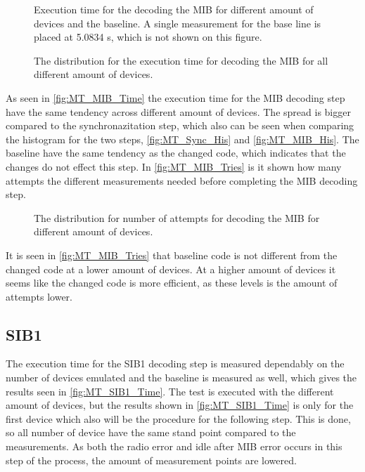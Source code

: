 \captionsetup{belowskip=0em}
\begin{minipage}{0.48\textwidth}
\begin{figure}[H]
\centering
\resizebox{0.9\textwidth}{!}{
}
\caption{Execution time for the decoding the MIB for different amount of devices and the baseline. A single measurement for the base line is placed at 5.0834 s, which is not shown on this figure.}
\label{fig:MT_MIB_Time}
\end{figure}
\end{minipage}%
\hfill
\begin{minipage}{0.48\textwidth}
\begin{figure}[H]
\centering
\resizebox{0.9\textwidth}{!}{
}
\caption{The distribution for the execution time for decoding the MIB for all different amount of devices.}
\label{fig:MT_MIB_His}
\end{figure}
\end{minipage}
\captionsetup{belowskip=-1.5em}

As seen in \autoref{fig:MT_MIB_Time} the execution time for the MIB decoding step have the same tendency across different amount of devices. The spread is bigger compared to the synchronazitation step, which also can be seen when comparing the histogram for the two steps, \autoref{fig:MT_Sync_His} and \autoref{fig:MT_MIB_His}. The baseline have the same tendency as the changed code, which indicates that the changes do not effect this step. In \autoref{fig:MT_MIB_Tries} is it shown how many attempts the different measurements needed before completing the MIB decoding step.

\begin{figure}[H]
\centering
\resizebox{0.5\textwidth}{!}{
}
\caption{The distribution for number of attempts for decoding the MIB for different amount of devices.}
\label{fig:MT_MIB_Tries}
\end{figure}

It is seen in \autoref{fig:MT_MIB_Tries} that baseline code is not different from the changed code at a lower amount of devices. At a higher amount of devices it seems like the changed code is more efficient, as these levels is the amount of attempts lower.

\subsection{SIB1}
The execution time for the SIB1 decoding step is measured dependably on the number of devices emulated and the baseline is measured as well, which gives the results seen in \autoref{fig:MT_SIB1_Time}. The test is executed with the different amount of devices, but the results shown in \autoref{fig:MT_SIB1_Time} is only for the first device which also will be the procedure for the following step. This is done, so all number of device have the same stand point compared to the measurements.
As both the radio error and idle after MIB error occurs in this step of the process, the amount of measurement points are lowered.

